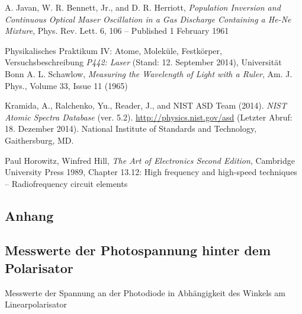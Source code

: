 \documentclass[11pt, a4paper]{article}
\numberwithin{equation}{section}
\begin{document}
\vspace{\fill}
\begin{thebibliography}{9}
A. Javan, W. R. Bennett, Jr., and D. R. Herriott,
\emph{Population Inversion and Continuous Optical Maser Oscillation in a Gas Discharge Containing a He-Ne Mixture},
Phys. Rev. Lett. 6, 106 – Published 1 February 1961

	Physikalisches Praktikum IV: Atome, Moleküle, Festkörper,
	Versuchsbeschreibung \emph{P442: Laser} (Stand: 12. September 2014),
	Universität Bonn
	A. L. Schawlow,
	\emph{Measuring the Wavelength of Light with a Ruler},
	Am. J. Phys., Volume 33, Issue 11 (1965)

	Kramida, A., Ralchenko, Yu., Reader, J., and NIST ASD Team (2014).
	\emph{NIST Atomic Spectra Database} (ver. 5.2).
	\url{http://physics.nist.gov/asd} (Letzter Abruf: 18. Dezember 2014).
	National Institute of Standards and Technology, Gaithersburg, MD.
	
	Paul Horowitz, Winfred Hill,
	\emph{The Art of Electronics Second Edition},
	Cambridge University Press 1989,
	Chapter 13.12: High frequency and high-speed techniques -- Radiofrequency circuit elements
 
\end{thebibliography}

\clearpage

\begin{appendix}
\section{Anhang}
\subsection{Messwerte der Photospannung hinter dem Polarisator}
\begin{table}[h]
	\centering
	
	\caption{Messwerte der Spannung an der Photodiode in Abhängigkeit des Winkels am Linearpolarisator}
	\label{tab:malus}
\end{table}

\end{appendix}
\end{document}
